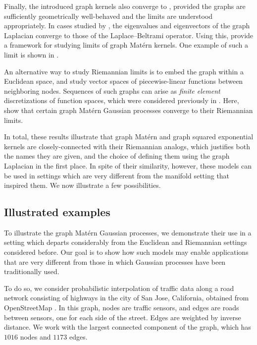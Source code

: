 \documentclass[11pt]{book}
\begin{document}
Finally, the introduced graph kernels also converge to , provided the graphs are sufficiently geometrically well-behaved and the limits are understood appropriately.
In cases studied by \textcite{belkin07,burago14}, the eigenvalues and eigenvectors of the graph Laplacian converge to those of the Laplace--Beltrami operator.
Using this, \textcite{sanzalonso21} provide a framework for studying limits of graph Matérn kernels.
One example of such a limit is shown in .

An alternative way to study Riemannian limits is to embed the graph within a Euclidean space, and study vector spaces of piecewise-linear functions between neighboring nodes.
Sequences of such graphs can arise as \emph{finite element} discretizations of function spaces, which were considered previously in .
Here, \textcite{lindgren11} show that certain graph Matérn Gaussian processes converge to their Riemannian limits.

In total, these results illustrate that graph Matérn and graph squared exponential kernels are closely-connected with their Riemannian analogs, which justifies both the names they are given, and the choice of defining them using the graph Laplacian in the first place.
In spite of their similarity, however, these models can be used in settings which are very different from the manifold setting that inspired them.
We now illustrate a few possibilities.

\subsection{Illustrated examples}

To illustrate the graph Matérn Gaussian processes, we demonstrate their use in a setting which departs considerably from the Euclidean and Riemannian settings considered before.
Our goal is to show how such models may enable applications that are very different from those in which Gaussian processes have been traditionally used.

To do so, we consider probabilistic interpolation of traffic data along a road network consisting of highways in the city of San Jose, California, obtained from OpenStreetMap \cite{osm17}.
In this graph, nodes are traffic sensors, and edges are roads between sensors, one for each side of the street.
Edges are weighted by inverse distance.
We work with the largest connected component of the graph, which has $1016$ nodes and $1173$ edges.
\end{document}
